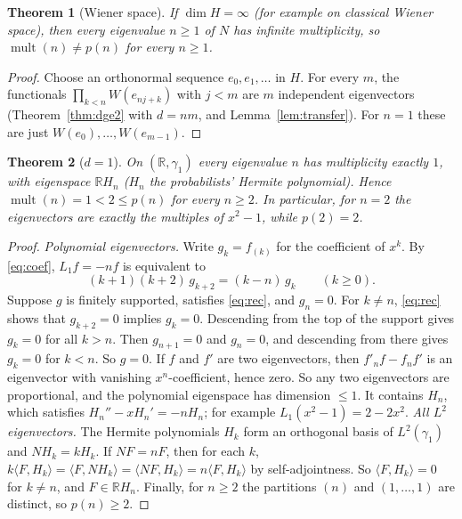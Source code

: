 \documentclass[11pt]{article}
\newtheorem{theorem}{Theorem}
\theoremstyle{definition}
\theoremstyle{remark}
\newcommand{\R}{\mathbb{R}}
\newcommand{\mult}{\operatorname{mult}}
\begin{document}
\begin{theorem}[Wiener space]\label{thm:wiener}
If $\dim H=\infty$ (for example on classical Wiener space), then every eigenvalue
$n\ge1$ of $N$ has infinite multiplicity, so $\mult(n)\ne p(n)$ for every $n\ge1$.
\end{theorem}
\begin{proof}
Choose an orthonormal sequence $e_0,e_1,\dots$ in $H$. For every $m$, the
functionals $\prod_{k<n}W(e_{nj+k})$ with $j<m$ are $m$ independent eigenvectors
(Theorem~\ref{thm:dge2} with $d=nm$, and Lemma~\ref{lem:transfer}). For $n=1$ these
are just $W(e_0),\dots,W(e_{m-1})$.
\end{proof}

\begin{theorem}[$d=1$]\label{thm:d1}
On $(\R,\gamma_1)$ every eigenvalue $n$ has multiplicity exactly $1$, with eigenspace
$\R H_n$ ($H_n$ the probabilists' Hermite polynomial). Hence $\mult(n)=1<2\le p(n)$ for every
$n\ge2$. In particular, for $n=2$ the eigenvectors are exactly the multiples of
$x^2-1$, while $p(2)=2$.
\end{theorem}
\begin{proof}
\emph{Polynomial eigenvectors.} Write $g_k=f_{(k)}$ for the coefficient of $x^k$. By
\eqref{eq:coef}, $L_1f=-nf$ is equivalent to
\begin{equation}\label{eq:rec}
(k+1)(k+2)\,g_{k+2}=(k-n)\,g_k\qquad(k\ge0).
\end{equation}
Suppose $g$ is finitely supported, satisfies \eqref{eq:rec}, and $g_n=0$. For $k\ne n$,
\eqref{eq:rec} shows that $g_{k+2}=0$ implies $g_k=0$. Descending from the top of the
support gives $g_k=0$ for all $k>n$. Then $g_{n+1}=0$ and $g_n=0$, and descending
from there gives $g_k=0$ for $k<n$. So $g=0$. If $f$ and $f'$ are two
eigenvectors, then $f'_nf-f_nf'$ is an eigenvector with vanishing $x^n$-coefficient,
hence zero. So any two eigenvectors are proportional, and the polynomial eigenspace has
dimension $\le1$. It contains $H_n$, which satisfies $H_n''-xH_n'=-nH_n$; for example
$L_1(x^2-1)=2-2x^2$.
\emph{All $L^2$ eigenvectors.} The Hermite polynomials $H_k$ form an orthogonal
basis of $L^2(\gamma_1)$ and $NH_k=kH_k$. If $NF=nF$, then for each $k$,
$k\langle F,H_k\rangle=\langle F,NH_k\rangle=\langle NF,H_k\rangle=n\langle F,H_k\rangle$
by self-adjointness. So $\langle F,H_k\rangle=0$ for $k\ne n$, and $F\in\R H_n$.
Finally, for $n\ge2$ the partitions $(n)$ and $(1,\dots,1)$ are distinct, so $p(n)\ge2$.
\end{proof}
\end{document}
